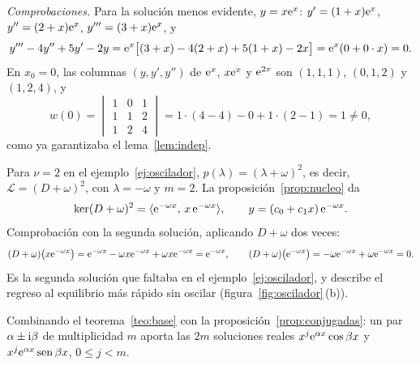 \documentclass[11pt,twoside]{article}
\newcommand\Lop{\mathcal L}
\newcommand\gen[1]{\langle#1\rangle}
\begin{document}
\begin{ejemplo}[$y'''-4y''+5y'-2y=0$ \cite{usal}]
\begin{pasos}
\begin{equation}
\end{equation}
\item \emph{Comprobaciones.} Para la solución menos evidente, $y=x\mathrm{e}^{x}$: $y'=(1+x)\mathrm{e}^{x}$, $y''=(2+x)\mathrm{e}^{x}$,
$y'''=(3+x)\mathrm{e}^{x}$, y
\begin{equation*}
y'''-4y''+5y'-2y=\mathrm{e}^{x}\big[(3+x)-4(2+x)+5(1+x)-2x\big]=\mathrm{e}^{x}(0+0\cdot x)=0.
\end{equation*}
En $x_0=0$, las columnas $(y,y',y'')$ de $\mathrm{e}^{x}$, $x\mathrm{e}^{x}$ y $\mathrm{e}^{2x}$ son $(1,1,1)$, $(0,1,2)$ y $(1,2,4)$, y
\begin{equation*}
w(0)=\begin{vmatrix}1&0&1\\1&1&2\\1&2&4\end{vmatrix}=1\cdot(4-4)-0+1\cdot(2-1)=1\neq0,
\end{equation*}
como ya garantizaba el lema~\ref{lem:indep}.
\end{pasos}
\end{ejemplo}

\begin{ejemplo}\label{ej:critico}
Para $\nu=2$ en el ejemplo~\ref{ej:oscilador}, $p(\lambda)=(\lambda+\omega)^2$, es decir, $\Lop=(D+\omega)^2$, con
$\lambda=-\omega$ y $m=2$. La proposición~\ref{prop:nucleo} da
\begin{equation}\label{eq:critico}
\ker(D+\omega)^2=\gen{\e^{-\omega x},\,x\,\e^{-\omega x}},\qquad y=(c_0+c_1x)\,\e^{-\omega x}.
\end{equation}
Comprobación con la segunda solución, aplicando $D+\omega$ dos veces:
\begin{equation*}
(D+\omega)\big(x\mathrm{e}^{-\omega x}\big)=\mathrm{e}^{-\omega x}-\omega x\mathrm{e}^{-\omega x}+\omega x\mathrm{e}^{-\omega x}=\mathrm{e}^{-\omega x},\qquad
(D+\omega)\big(\mathrm{e}^{-\omega x}\big)=-\omega\mathrm{e}^{-\omega x}+\omega\mathrm{e}^{-\omega x}=0.
\end{equation*}
Es la segunda solución que faltaba en el ejemplo~\ref{ej:oscilador}, y describe el regreso al equilibrio más rápido sin
oscilar (figura~\ref{fig:oscilador}\,(b)).
\end{ejemplo}

\begin{observacion}\label{obs:compmult}
Combinando el teorema~\ref{teo:base} con la proposición~\ref{prop:conjugadas}: un par $\alpha\pm\mathrm{i}\beta$ de multiplicidad
$m$ aporta las $2m$ soluciones reales $x^j\mathrm{e}^{\alpha x}\cos\beta x$ y $x^j\mathrm{e}^{\alpha x}\operatorname{sen}\beta x$, $0\le j<m$.
\end{observacion}
\end{document}

